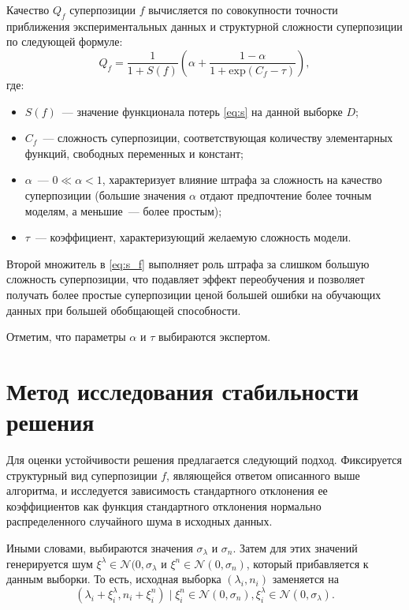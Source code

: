 \documentclass[12pt,a4paper]{article}
\begin{document}
Качество $Q_f$ суперпозиции $f$ вычисляется по совокупности точности приближения
экспериментальных данных и структурной сложности суперпозиции по следующей формуле:
\begin{equation}
  \label{eq:s_f}
  Q_f = \frac{1}{1 + S(f)} \left(\alpha + \frac{1 - \alpha}{1 + \text{exp} (C_f - \tau)}\right),
\end{equation}
где:
\begin{itemize}
  \item[] $S(f)$~--- значение функционала потерь \eqref{eq:s} на данной выборке $D$;
  \item[] $C_f$~--- сложность суперпозиции, соответствующая количеству элементарных
	функций, свободных переменных и констант;
  \item[] $\alpha$~--- $0 \ll \alpha < 1$, характеризует влияние штрафа за сложность
	на качество суперпозиции (большие значения $\alpha$ отдают предпочтение более
	точным моделям, а меньшие~--- более простым);
  \item[] $\tau$~--- коэффициент, характеризующий желаемую сложность модели.
\end{itemize}

Второй множитель в \eqref{eq:s_f} выполняет роль штрафа за слишком
большую сложность суперпозиции, что подавляет эффект переобучения и позволяет
получать более простые суперпозиции ценой большей ошибки на обучающих данных
при большей обобщающей способности.

Отметим, что параметры $\alpha$ и $\tau$ выбираются экспертом.

\section{Метод исследования стабильности решения}

Для оценки устойчивости решения предлагается следующий подход. Фиксируется структурный вид суперпозиции $f$,
являющейся ответом описанного выше алгоритма, и исследуется
зависимость стандартного отклонения ее коэффициентов как функция стандартного отклонения
нормально распределенного случайного шума в исходных данных.

Иными словами, выбираются значения $\sigma_{\lambda}$ и $\sigma_n$. Затем для этих
значений генерируется шум
$\xi^{\lambda} \in \mathcal{N}(0, \sigma_{\lambda}$ и $\xi^n \in \mathcal{N}(0, \sigma_n)$,
который прибавляется к данным выборки. То есть, исходная выборка $(\lambda_i, n_i)$ заменяется на
\[
  (\lambda_i + \xi^{\lambda}_i, n_i + \xi^n_i) \mid \xi^n_i \in \mathcal{N}(0, \sigma_n), \xi^{\lambda}_i \in \mathcal{N}(0, \sigma_{\lambda}).
\]
\end{document}
